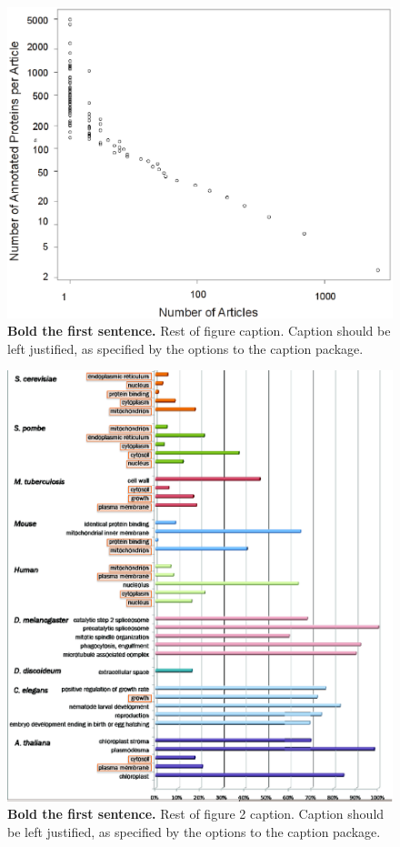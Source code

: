 \documentclass[12pt]{article}
\begin{document}
\begin{figure}[!ht]
\begin{center}
\includegraphics[width=6in]{papers-prots.eps}
\end{center}
\caption{
{\bf Bold the first sentence.}  Rest of figure  caption.  Caption 
should be left justified, as specified by the options to the caption 
package.
}
\label{fig:papers-prots}
\end{figure}

\begin{figure}[!ht]
\begin{center}
\includegraphics[width=6in]{rel-contrib.eps}
\end{center}
\caption{
{\bf Bold the first sentence.}  Rest of figure 2  caption.  Caption 
should be left justified, as specified by the options to the caption 
package.
}
\label{fig:rel-contrib}
\end{figure}
\end{document}

